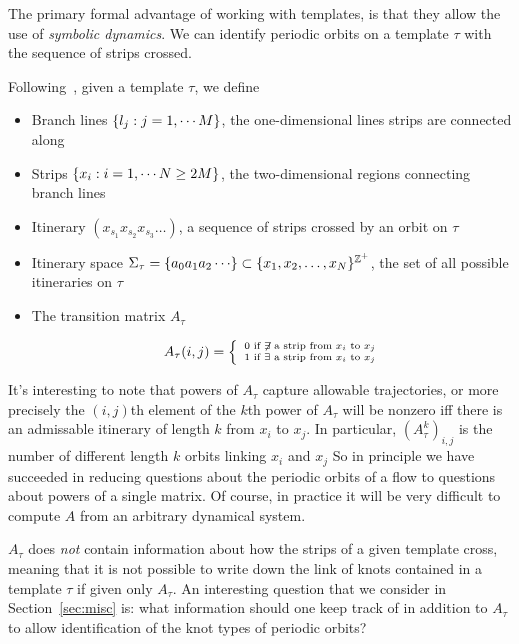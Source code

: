 \documentclass[paper.tex]{subfiles}
\begin{document}
The primary formal advantage of working with templates, is that they allow the use of \emph{symbolic dynamics}. We can identify periodic orbits on a template $\tau$ with the sequence of strips crossed.

\begin{definition}
  Following~\cite{knottyode}, given a template $\tau$, we define
  \begin{itemize}
    \item Branch lines  $\{ l_j : j = 1, \cdots M \}$, the one-dimensional lines strips are connected along
    \item Strips $\{ x_i : i = 1, \cdots N \geq 2 M \}$, the two-dimensional regions connecting branch lines
    \item Itinerary $(x_{s_1}x_{s_2}x_{s_3} \dots)$, a sequence of strips crossed by an orbit on $\tau$
    \item Itinerary space $\Sigma_\tau = \set{a_0 a_1 a_2 \cdots} \subset \set{x_1, x_2, \ldots, x_N}^{\Z^+}$, the set of all possible itineraries on $\tau$
    \item The transition matrix $A_\tau$

      \begin{equation}
        A_\tau(i,j) = \left\{ \
        \begin{smallmatrix}
          0 \text{ if } \not\exists \text{ a strip from } x_i \text{ to } x_j \\
          1 \text{ if } \exists \text{ a strip from } x_i \text{ to } x_j
        \end{smallmatrix}
        \right.
      \end{equation}
  \end{itemize}
\end{definition}

It's interesting to note that powers of $A_\tau$ capture allowable trajectories, or more precisely the $(i,j)$th element of the $k$th power of $A_\tau$ will be nonzero iff there is an admissable itinerary of length
$k$ from $x_i$ to $x_j$.
In particular, ${(A_\tau^k)}_{i,j}$ is the number of different length $k$ orbits linking $x_i$ and $x_j$
So in principle we have succeeded in reducing questions about the periodic orbits of a flow to questions about powers of a single matrix. Of course, in practice it will be very difficult to compute $A$ from an arbitrary
dynamical system.

$A_\tau$ does \emph{not} contain information about how the strips of a given template cross, meaning that it is not possible to write down the link of knots contained in a template $\tau$ if given only $A_\tau$.
 An interesting question that we consider
in Section~\ref{sec:misc} is: what information should one keep track of in addition to $A_\tau$ to allow identification of the knot types of periodic orbits?
\end{document}
